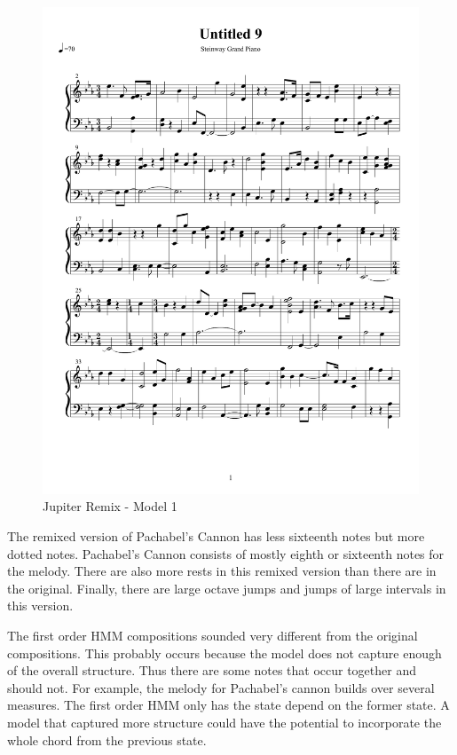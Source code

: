 \documentclass{article} %
\begin{document}
\begin{figure}[H]
\centering
\caption{Jupiter Remix - Model 1}
\includegraphics [scale = 0.6] {JupiterRemix-cropped.pdf}
\end{figure}

The remixed version of Pachabel's Cannon has less sixteenth notes but more dotted notes. Pachabel's Cannon consists of mostly eighth or sixteenth notes for the melody. There are also more rests in this remixed version than there are in the original. Finally, there are large octave jumps and jumps of large intervals in this version.

The first order HMM compositions sounded very different from the original compositions. This probably occurs because the model does not capture enough of the overall structure. Thus there are some notes that occur together and should not. For example, the melody for Pachabel's cannon builds over several measures. The first order HMM only has the state depend on the former state. A model that captured more structure could have the potential to incorporate the whole chord from the previous state. 
\end{document}
